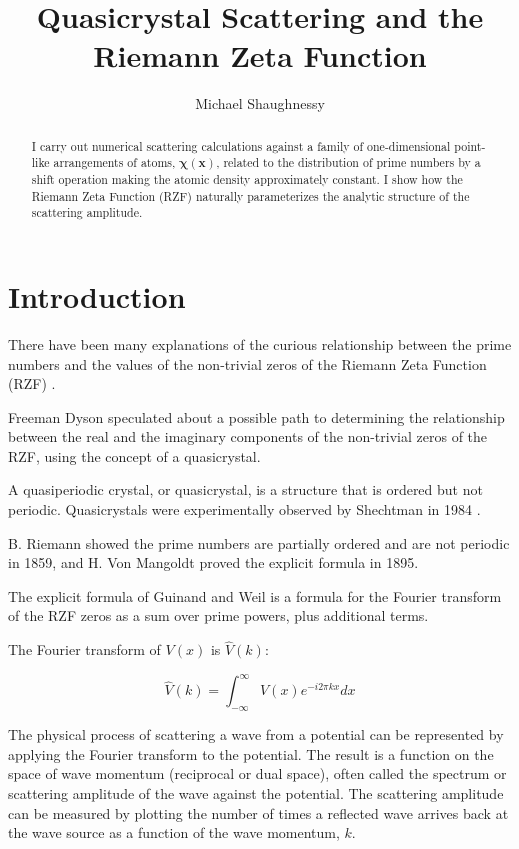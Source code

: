 \documentclass[11pt, oneside]{article}
\title{Quasicrystal Scattering and the Riemann Zeta Function}
\author{Michael Shaughnessy}
\begin{document}
\maketitle

\begin{abstract}
I carry out numerical scattering calculations against a family of one-dimensional point-like arrangements of atoms, $\mathbf{\chi(x)}$, related to the distribution of prime numbers by a shift operation making the atomic density approximately constant. 
I show how the Riemann Zeta Function (RZF) naturally parameterizes the analytic structure of the scattering amplitude.
\end{abstract}

\section{Introduction}

There have been many explanations of the curious relationship between the prime numbers and the values of the non-trivial zeros of the Riemann Zeta Function (RZF) \cite{Riemann1859, Selberg1956, Dyson2009, Zhang2014}.

Freeman Dyson \cite{Baez2013} speculated about a possible path to determining the relationship between the real and the imaginary components of the non-trivial zeros of the RZF, using the concept of a quasicrystal.

A quasiperiodic crystal, or quasicrystal, is a structure that is ordered but not periodic. Quasicrystals were experimentally observed by Shechtman in 1984 \cite{Shectman1984}. 

B. Riemann showed the prime numbers are partially ordered and are not periodic \cite{Riemann1859} in 1859, and H. Von Mangoldt \cite{VonMangoldt1895} proved the explicit formula in 1895.

The explicit formula of Guinand and Weil \cite{Weil} is a formula for the Fourier transform of the RZF zeros as a sum over prime powers, plus additional terms.  

The Fourier transform of $V(x)$ is $\hat{V}(k)$:

\begin{equation}
\hat{V}(k) = \int_{-\infty}^{\infty}V(x)e^{-i2\pi kx}dx
\end{equation}

The physical process of scattering a wave from a potential can be represented by applying the Fourier transform to the potential. The result is a function on the space of wave momentum (reciprocal or dual space), often called the spectrum or scattering amplitude of the wave against the potential. The scattering amplitude can be measured by plotting the number of times a reflected wave arrives back at the wave source as a function of the wave momentum, $k$.
\end{document}
